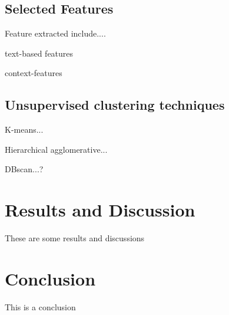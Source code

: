 \documentclass[
10pt, %
a4paper, %
oneside, %
headinclude,footinclude, %
BCOR5mm, %
]{scrartcl}
\begin{document}
\subsection{Selected Features}
Feature extracted include....

text-based features


context-features



\subsection{Unsupervised clustering techniques}

K-means...

Hierarchical agglomerative...

DBscan...?



\section{Results and Discussion}

These are some results and discussions

\section{Conclusion}

This is a conclusion

\newpage
\renewcommand{\refname}{\spacedlowsmallcaps{References}} %





\end{document}
